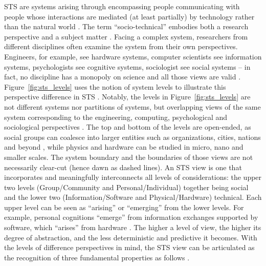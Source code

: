 STS are systems arising through encompassing people communicating with people whose interactions are mediated (at least partially) by technology rather than the natural world \cite{Whitworth2009}.
The term ``socio-technical'' embodies both a research perspective and a subject matter \cite{Lee2001}. Facing a complex system, researchers from different disciplines often examine the system from their own perspectives. Engineers, for example, see hardware systems, computer scientists see information systems, psychologists see cognitive systems, sociologist see social systems -- in fact, no discipline has a monopoly on science and all those views are valid \cite{Whitworth2013}. 
Figure~\ref{fig:sts_levels} uses the notion of system levels to illustrate this perspective difference in STS \cite{Whitworth2009,Whitworth2013}. Notably, the levels in Figure~\ref{fig:sts_levels} are not different systems nor partitions of systems, but overlapping views of the same system corresponding to the engineering, computing, psychological and sociological perspectives \cite{Whitworth2009}. The top and bottom of the levels are open-ended, 
as social groups can coalesce into larger entities such as organizations, cities, nations and beyond \cite{Whitworth2009a}, while physics and hardware can be studied in micro, nano and smaller scales. The system boundary and the boundaries of those views are not necessarily clear-cut (hence dawn as dashed lines). An STS view is one that incorporates and meaningfully interconnects all levels of considerations: the upper two levels (Group/Community and Personal/Individual) together being social and the lower two (Information/Software and Physical/Hardware) technical. Each upper level can be seen as   ``arising'' or ``emerging'' from the lower levels. For example, personal cognitions ``emerge'' from information exchanges supported by software, which ``arises'' from hardware \cite{Whitworth2009}. The higher a level of view, the higher its degree of abstraction, and the less deterministic and predictive it becomes.  
% 
With the levels of difference perspectives in mind, the STS view can be articulated as the recognition of three fundamental properties as follows \cite{Sawyer2014}. 
%
%
